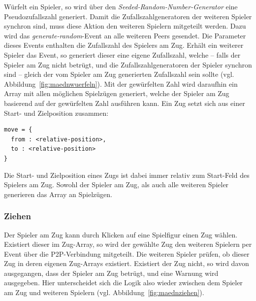Würfelt ein Spieler, so wird über den \textit{Seeded-Random-Number-Generator} eine Pseudozufallszahl generiert. Damit die Zufallszahlgeneratoren der weiteren Spieler synchron sind, muss diese Aktion den weiteren Spielern mitgeteilt werden. Dazu wird das \textit{generate-random}-Event an alle weiteren Peers gesendet. Die Parameter dieses Events enthalten die Zufallszahl des Spielers am Zug. Erhält ein weiterer Spieler das Event, so generiert dieser eine eigene Zufallszahl, welche -- falls der Spieler am Zug nicht betrügt, und die Zufallszahlgeneratoren der Spieler synchron sind -- gleich der vom Spieler am Zug generierten Zufallszahl sein sollte (vgl. Abbildung~\ref{fig:maednwuerfeln}). Mit der gewürfelten Zahl wird daraufhin ein Array mit allen möglichen Spielzügen generiert, welche der Spieler am Zug basierend auf der gewürfelten Zahl ausführen kann. Ein Zug setzt sich aus einer Start- und Zielposition zusammen:\par

\lstset{style=STYLE_COMMAND_LINE_ARGUMENT_SINGLE_LINE}
\begin{minipage}{\textwidth}
\begin{singlespace}
\begin{lstlisting}[belowskip=-0.8 \baselineskip]
move = {
  from : <relative-position>,
  to : <relative-position>
}
\end{lstlisting}
\end{singlespace}
\end{minipage}

Die Start- und Zielposition eines Zugs ist dabei immer relativ zum Start-Feld des Spielers am Zug. Sowohl der Spieler am Zug, als auch alle weiteren Spieler generieren das Array an Spielzügen.\par

\subsubsection{Ziehen}
Der Spieler am Zug kann durch Klicken auf eine Spielfigur einen Zug wählen. Existiert dieser im Zug-Array, so wird der gewählte Zug den weiteren Spielern per Event über die \acs{P2P}-Verbindung mitgeteilt. Die weiteren Spieler prüfen, ob dieser Zug in deren eigenen Zug-Arrays existiert. Existiert der Zug nicht, so wird davon ausgegangen, dass der Spieler am Zug betrügt, und eine Warnung wird ausgegeben. Hier unterscheidet sich die Logik also wieder zwischen dem Spieler am Zug und weiteren Spielern (vgl. Abbildung~\ref{fig:maednziehen}).

